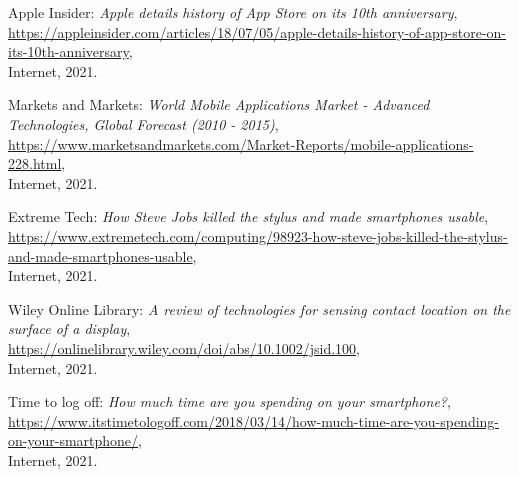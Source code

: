 \begin{thebibliography}{x}
	
	Apple Insider: \emph{Apple details history of App Store on its 10th anniversary}, \\
	\url{https://appleinsider.com/articles/18/07/05/apple-details-history-of-app-store-on-its-10th-anniversary}, \\
	Internet, 2021.
	
	Markets and Markets: \emph{World Mobile Applications Market - Advanced Technologies, Global Forecast (2010 - 2015)}, \\
	\url{https://www.marketsandmarkets.com/Market-Reports/mobile-applications-228.html}, \\
	Internet, 2021.
	
	Extreme Tech: \emph{How Steve Jobs killed the stylus and made smartphones usable}, \\
	\url{https://www.extremetech.com/computing/98923-how-steve-jobs-killed-the-stylus-and-made-smartphones-usable}, \\
	Internet, 2021.
	
	Wiley Online Library: \emph{A review of technologies for sensing contact location on the surface of a display}, \\
	\url{https://onlinelibrary.wiley.com/doi/abs/10.1002/jsid.100}, \\
	Internet, 2021.
	
	
	Time to log off: \emph{How much time are you spending on your smartphone?}, \\
	\url{https://www.itstimetologoff.com/2018/03/14/how-much-time-are-you-spending-on-your-smartphone/}, \\
	Internet, 2021.
	

\end{thebibliography}
